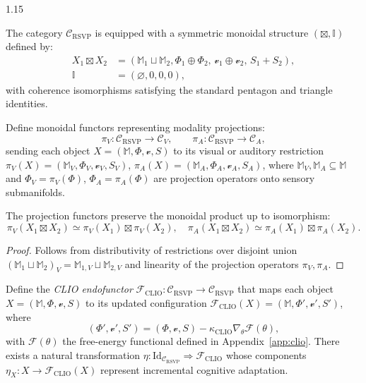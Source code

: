 \documentclass[12pt,a4paper]{article}
\begin{document}
\begin{spacing}{1.15}
\begin{definition}
\label{def:monoidal}
The category \(\mathcal{C}_{\mathrm{RSVP}}\) is equipped with a symmetric monoidal structure
\((\boxtimes,\mathbb{I})\) defined by:
\begin{align*}
  X_1 \boxtimes X_2 &= (\mathbb{M}_1 \sqcup \mathbb{M}_2,
     \Phi_1 \oplus \Phi_2,\, \boldsymbol{\mathcal{v}}_1 \oplus \boldsymbol{\mathcal{v}}_2,\, S_1+S_2),\\
  \mathbb{I} &= (\varnothing, 0, 0, 0),
\end{align*}
with coherence isomorphisms satisfying the standard pentagon and triangle identities.
\end{definition}

\begin{definition}
\label{def:projections}
Define monoidal functors representing modality projections:
\[
  \pi_V : \mathcal{C}_{\mathrm{RSVP}} \to \mathcal{C}_V,
  \qquad
  \pi_A : \mathcal{C}_{\mathrm{RSVP}} \to \mathcal{C}_A,
\]
sending each object \(X=(\mathbb{M},\Phi,\boldsymbol{\mathcal{v}},S)\)
to its visual or auditory restriction
\(\pi_V(X)=(\mathbb{M}_V,\Phi_V,\boldsymbol{\mathcal{v}}_V,S_V)\),
\(\pi_A(X)=(\mathbb{M}_A,\Phi_A,\boldsymbol{\mathcal{v}}_A,S_A)\),
where \(\mathbb{M}_V,\mathbb{M}_A\subseteq\mathbb{M}\)
and \(\Phi_V=\pi_V(\Phi)\), \(\Phi_A=\pi_A(\Phi)\)
are projection operators onto sensory submanifolds.
\end{definition}

\begin{proposition}
\label{prop:monoidality}
The projection functors preserve the monoidal product up to isomorphism:
\[
  \pi_V(X_1\boxtimes X_2) \simeq \pi_V(X_1)\boxtimes \pi_V(X_2),
  \quad
  \pi_A(X_1\boxtimes X_2) \simeq \pi_A(X_1)\boxtimes \pi_A(X_2).
\]
\end{proposition}

\begin{proof}
Follows from distributivity of restrictions over disjoint union
\((\mathbb{M}_1\sqcup\mathbb{M}_2)_V = \mathbb{M}_{1,V}\sqcup\mathbb{M}_{2,V}\)
and linearity of the projection operators \(\pi_V,\pi_A\).
\end{proof}

\begin{definition}
\label{def:clio}
Define the \emph{CLIO endofunctor}
\(\mathcal{F}_{\mathrm{CLIO}}:\mathcal{C}_{\mathrm{RSVP}}\to\mathcal{C}_{\mathrm{RSVP}}\)
that maps each object
\(X=(\mathbb{M},\Phi,\boldsymbol{\mathcal{v}},S)\)
to its updated configuration
\(\mathcal{F}_{\mathrm{CLIO}}(X)=(\mathbb{M},\Phi',\boldsymbol{\mathcal{v}}',S')\),
where
\[
(\Phi',\boldsymbol{\mathcal{v}}',S')
=(\Phi,\boldsymbol{\mathcal{v}},S)
-\kappa_{\mathrm{CLIO}}\nabla_\theta\mathcal{F}(\theta),
\]
with \(\mathcal{F}(\theta)\) the free-energy functional defined in Appendix~\ref{app:clio}.
There exists a natural transformation
\(\eta:\mathrm{Id}_{\mathcal{C}_{\mathrm{RSVP}}}\Rightarrow\mathcal{F}_{\mathrm{CLIO}}\)
whose components
\(\eta_X:X\to\mathcal{F}_{\mathrm{CLIO}}(X)\)
represent incremental cognitive adaptation.
\end{definition}


\end{spacing}
\end{document}
